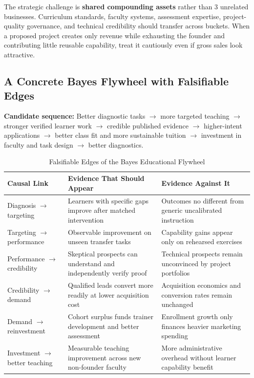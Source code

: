 The strategic challenge is \textbf{shared compounding assets} rather than 3 unrelated businesses. Curriculum standards, faculty systems, assessment expertise, project-quality governance, and technical credibility should transfer across buckets. When a proposed project creates only revenue while exhausting the founder and contributing little reusable capability, treat it cautiously even if gross sales look attractive.

\subsection{A Concrete Bayes Flywheel with Falsifiable Edges}
\label{sec:bayes_flywheel_falsifiable_edges}

\textbf{Candidate sequence:} Better diagnostic tasks $\to$ more targeted teaching $\to$ stronger verified learner work $\to$ credible published evidence $\to$ higher-intent applications $\to$ better class fit and more sustainable tuition $\to$ investment in faculty and task design $\to$ better diagnostics.

\begin{table}[t]
\centering
\small
\caption{Falsifiable Edges of the Bayes Educational Flywheel}
\label{tab:bayes_flywheel_falsifiable_edges}
\begin{tabularx}{\textwidth}{p{4.2cm} X X}
\toprule
\textbf{Causal Link} & \textbf{Evidence That Should Appear} & \textbf{Evidence Against It} \\
\midrule
Diagnosis $\to$ targeting & Learners with specific gaps improve after matched intervention & Outcomes no different from generic uncalibrated instruction \\
\addlinespace[2pt]
Targeting $\to$ performance & Observable improvement on unseen transfer tasks & Capability gains appear only on rehearsed exercises \\
\addlinespace[2pt]
Performance $\to$ credibility & Skeptical prospects can understand and independently verify proof & Technical prospects remain unconvinced by project portfolios \\
\addlinespace[2pt]
Credibility $\to$ demand & Qualified leads convert more readily at lower acquisition cost & Acquisition economics and conversion rates remain unchanged \\
\addlinespace[2pt]
Demand $\to$ reinvestment & Cohort surplus funds trainer development and better assessment & Enrollment growth only finances heavier marketing spending \\
\addlinespace[2pt]
Investment $\to$ better teaching & Measurable teaching improvement across new non-founder faculty & More administrative overhead without learner capability benefit \\
\bottomrule
\end{tabularx}
\end{table}

